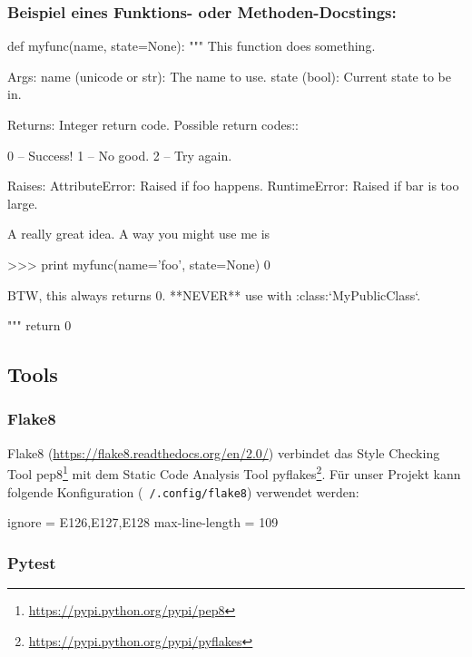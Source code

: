 \subsubsection*{Beispiel eines Funktions- oder Methoden-Docstings:}

\begin{pythoncode}
def myfunc(name, state=None):
    """
    This function does something.

    Args:
        name (unicode or str):
            The name to use.
        state (bool):
            Current state to be in.

    Returns:
        Integer return code. Possible return codes::

            0 -- Success!
            1 -- No good.
            2 -- Try again.

    Raises:
        AttributeError:
            Raised if foo happens.
        RuntimeError:
            Raised if bar is too large.

    A really great idea. A way you might use me is

    >>> print myfunc(name='foo', state=None)
    0

    BTW, this always returns 0. **NEVER** use with :class:`MyPublicClass`.

    """
    return 0
\end{pythoncode}

\subsection{Tools}

\subsubsection{Flake8}

Flake8 (\url{https://flake8.readthedocs.org/en/2.0/}) verbindet das Style
Checking Tool pep8\footnote{\url{https://pypi.python.org/pypi/pep8}} mit dem
Static Code Analysis Tool
pyflakes\footnote{\url{https://pypi.python.org/pypi/pyflakes}}. Für unser
Projekt kann folgende Konfiguration (\texttt{~/.config/flake8}) verwendet
werden:

\begin{inicode}
[flake8]
ignore = E126,E127,E128
max-line-length = 109
\end{inicode}

\subsubsection{Pytest}

